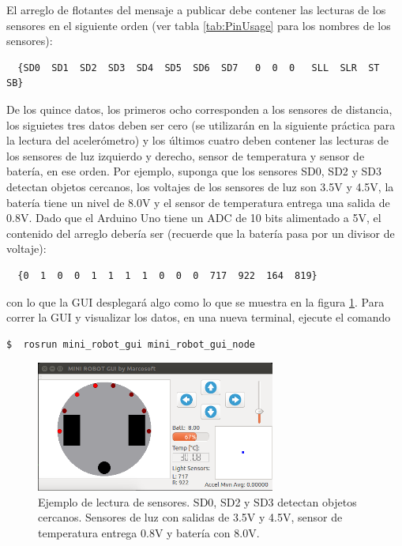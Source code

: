 \documentclass[a4paper,12pt]{article}
\begin{document}
El arreglo de flotantes del mensaje a publicar debe contener las lecturas de los sensores en el siguiente orden (ver tabla \ref{tab:PinUsage} para los nombres de los sensores):
\begin{verbatim}
  {SD0  SD1  SD2  SD3  SD4  SD5  SD6  SD7   0  0  0   SLL  SLR  ST  SB}
\end{verbatim}

De los quince datos, los primeros ocho corresponden a los sensores de distancia, los siguietes tres datos deben ser cero (se utilizarán en la siguiente práctica para la lectura del acelerómetro) y los últimos cuatro deben contener las lecturas de los sensores de luz izquierdo y derecho, sensor de temperatura y sensor de batería, en ese orden. Por ejemplo, suponga que los sensores SD0, SD2 y SD3 detectan objetos cercanos, los voltajes de los sensores de luz son 3.5V y 4.5V, la batería tiene un nivel de 8.0V y el sensor de temperatura entrega una salida de 0.8V. Dado que el Arduino Uno tiene un ADC de 10 bits alimentado a 5V, el contenido del arreglo debería ser (recuerde que la batería pasa por un divisor de voltaje):
\begin{verbatim}
  {0  1  0  0  1  1  1  1  0  0  0  717  922  164  819}
\end{verbatim}

con lo que la GUI desplegará algo como lo que se muestra en la figura \ref{fig:Example}. Para correr la GUI y visualizar los datos, en una nueva terminal, ejecute el comando

\begin{lstlisting}[language=bash]
$  rosrun mini_robot_gui mini_robot_gui_node
\end{lstlisting}

\begin{figure}
  \centering
  \includegraphics[width=0.7\textwidth]{Figures/SensorExample.png}
  \caption{Ejemplo de lectura de sensores. SD0, SD2 y SD3 detectan objetos cercanos. Sensores de luz con salidas de 3.5V y 4.5V, sensor de temperatura entrega 0.8V y batería con 8.0V.}
  \label{fig:Example}
\end{figure}
\end{document}
